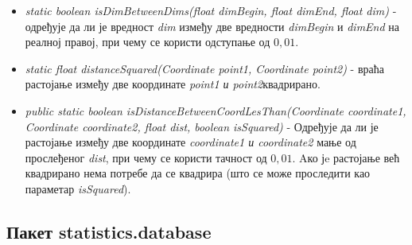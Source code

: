\begin{itemize}
\item \emph{static boolean isDimBetweenDims(float dimBegin, float dimEnd, float dim)} -  одређује да ли је вредност \emph{dim} између две вредности \emph{dimBegin} и \emph{dimEnd} на реалној правој, при чему се користи одступање од $0,01$.
\item \emph{static float distanceSquared(Coordinate point1, Coordinate point2)} - враћа растојање између две координате \emph{point1 \emph{и} point2}квадрирано.
\item \emph{ public static boolean isDistanceBetweenCoordLesThan(Coordinate coordinate1, Coordinate coordinate2, float dist, boolean isSquared)} -  Одређује да ли је растојање између две координате \emph{coordinate1 \emph{и} coordinate2} мање од прослеђеног \emph{dist}, при чему се користи тачност од $0,01$. Aко јe растојање већ квадрирано нема потребе да се квадрира (што се може проследити као параметар \emph{isSquared}).
\end{itemize}

\subsection{Пакет statistics.database}

